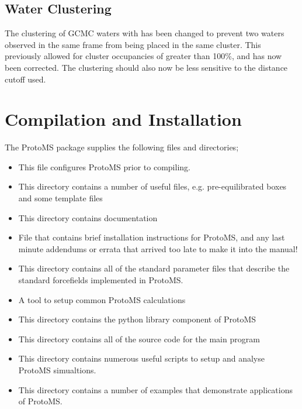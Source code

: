 \documentclass[letterpaper,10pt,english]{sphinxmanual}
\begin{document}
\section{Water Clustering}
\label{\detokenize{changelog:water-clustering}}
The clustering of GCMC waters with  has been changed to prevent two waters observed in the same frame from being placed in the same cluster. This previously allowed for cluster occupancies of greater than 100\%, and has now been corrected. The clustering should also now be less sensitive to the distance cutoff used.


\chapter{Compilation and Installation}
\label{\detokenize{compilation:compilation-and-installation}}\label{\detokenize{compilation::doc}}
The ProtoMS package supplies the following files and directories;
\begin{itemize}
\item {} 
 This file configures ProtoMS prior to compiling.

\item {} 
 This directory contains a number of useful files, e.g. pre-equilibrated boxes and some template files

\item {} 
 This directory contains documentation

\item {} 
 File that contains brief installation instructions for ProtoMS, and any last minute addendums or errata that arrived too late to make it into the manual!

\item {} 
 This directory contains all of the standard parameter files that describe the standard forcefields implemented in ProtoMS.

\item {} 
 A tool to setup common ProtoMS calculations

\item {} 
 This directory contains the python library component of ProtoMS

\item {} 
 This directory contains all of the source code for the main program

\item {} 
 This directory contains numerous useful scripts to setup and analyse ProtoMS simualtions.

\item {} 
 This directory contains a number of examples that demonstrate applications of ProtoMS.

\end{itemize}
\end{document}
